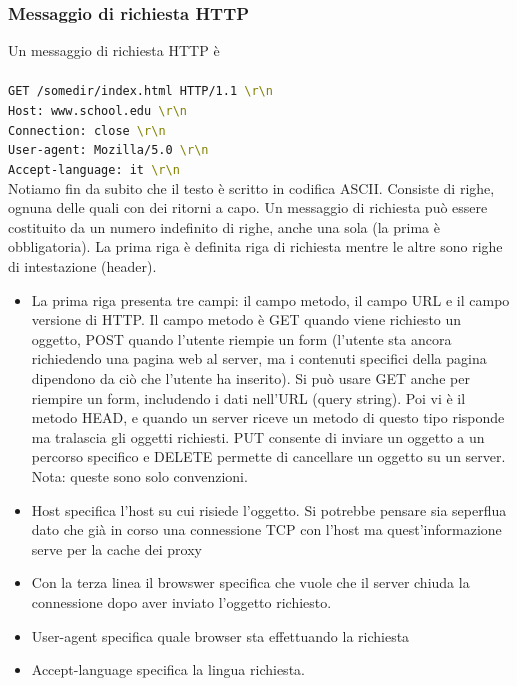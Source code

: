 \documentclass{book}
\begin{document}
\subsubsection*{Messaggio di richiesta HTTP}
Un messaggio di richiesta HTTP è
\\ \\
\texttt{GET /somedir/index.html HTTP/1.1 \textcolor{olive}{\textbackslash{r}\textbackslash{n}}}\\
\texttt{Host: www.school.edu \textcolor{olive}{\textbackslash{r}\textbackslash{n}}}\\
\texttt{Connection: close \textcolor{olive}{\textbackslash{r}\textbackslash{n}}}\\
\texttt{User-agent: Mozilla/5.0 \textcolor{olive}{\textbackslash{r}\textbackslash{n}}}\\
\texttt{Accept-language: it \textcolor{olive}{\textbackslash{r}\textbackslash{n}}}\\

Notiamo fin da subito che il testo è scritto in codifica ASCII. Consiste di righe, ognuna delle quali con dei ritorni a capo. Un messaggio di richiesta può essere costituito da un numero indefinito di righe, anche una sola (la prima è obbligatoria). La prima riga è definita riga di richiesta mentre le altre sono righe di intestazione (header).

\begin{itemize}
	\item La prima riga presenta tre campi: il campo metodo, il campo URL e il campo versione di HTTP. Il campo metodo è GET quando viene richiesto un oggetto, POST quando l'utente riempie un form (l'utente sta ancora richiedendo una pagina web al server, ma i contenuti specifici della pagina dipendono da ciò che l'utente ha inserito). Si può usare GET anche per riempire un form, includendo i dati nell'URL (query string). Poi vi è il metodo HEAD, e quando un server riceve un metodo di questo tipo risponde ma tralascia gli oggetti richiesti. PUT consente di inviare un oggetto a un percorso specifico e DELETE permette di cancellare un oggetto su un server. Nota: queste sono solo convenzioni.
	\item Host specifica l'host su cui risiede l'oggetto. Si potrebbe pensare sia seperflua dato che già in corso una connessione TCP con l'host ma quest'informazione serve per la cache dei proxy
	\item Con la terza linea il browswer specifica che vuole che il server chiuda la connessione dopo aver inviato l'oggetto richiesto.
	\item User-agent specifica quale browser sta effettuando la richiesta
	\item Accept-language specifica la lingua richiesta.
\end{itemize}
\end{document}
